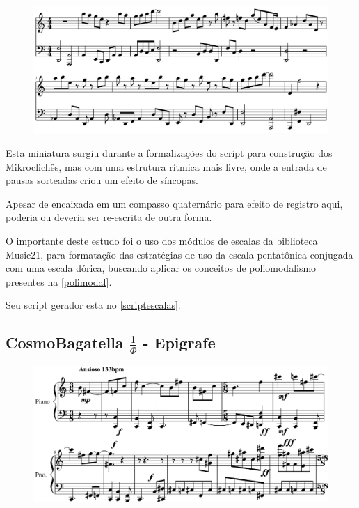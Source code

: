 \documentclass[
	12pt,				%
	openright,			%
	twoside,			%
	a4paper,			%
	english,			%
	french,				%
	spanish,			%
	brazil				%
	]{abntex2}
\begin{document}
\begin{figure}[!h]
	\begin{center}
	    \includegraphics*[scale=0.4]{score/ExperimentoPentatonico.png}
	\end{center}
\end{figure}


Esta miniatura surgiu durante a formalizações do script para construção dos Mikroclichês, mas com uma estrutura rítmica mais livre, onde a entrada de pausas sorteadas criou um efeito de síncopas.

Apesar de encaixada em um compasso quaternário para efeito de registro aqui, poderia ou deveria ser re-escrita de outra forma.

O importante deste estudo foi o uso dos módulos de escalas da biblioteca Music21, para formatação das estratégias de uso da escala pentatônica conjugada com uma escala dórica, buscando aplicar os conceitos de poliomodalismo presentes na \autoref{polimodal}. 

Seu script gerador esta no \autoref{scriptescalas}.


\subsection{CosmoBagatella $ \frac{1}{\Phi} $ - Epigrafe }

\begin{figure}[!h]
	\begin{center}
	    \includegraphics*[scale=0.35]{score/epigrafe01.png}
	\end{center}
\end{figure}
\end{document}
